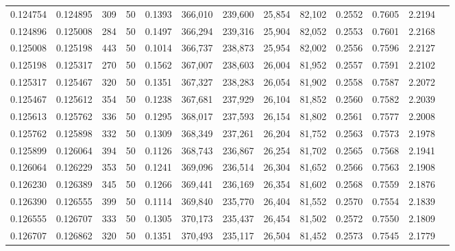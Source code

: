 \begin{tabular}{rrrrrrrrrrrrr}
0.124754 & 0.124895 &   309 &  50 &                                     0.1393 & 366,010 & 239,600 &  25,854 &  82,102 & 0.2552 & 0.7605 & 2.2194 \\
0.124896 & 0.125008 &   284 &  50 &                                     0.1497 & 366,294 & 239,316 &  25,904 &  82,052 & 0.2553 & 0.7601 & 2.2168 \\
0.125008 & 0.125198 &   443 &  50 &                                     0.1014 & 366,737 & 238,873 &  25,954 &  82,002 & 0.2556 & 0.7596 & 2.2127 \\
0.125198 & 0.125317 &   270 &  50 &                                     0.1562 & 367,007 & 238,603 &  26,004 &  81,952 & 0.2557 & 0.7591 & 2.2102 \\
0.125317 & 0.125467 &   320 &  50 &                                     0.1351 & 367,327 & 238,283 &  26,054 &  81,902 & 0.2558 & 0.7587 & 2.2072 \\
0.125467 & 0.125612 &   354 &  50 &                                     0.1238 & 367,681 & 237,929 &  26,104 &  81,852 & 0.2560 & 0.7582 & 2.2039 \\
0.125613 & 0.125762 &   336 &  50 &                                     0.1295 & 368,017 & 237,593 &  26,154 &  81,802 & 0.2561 & 0.7577 & 2.2008 \\
0.125762 & 0.125898 &   332 &  50 &                                     0.1309 & 368,349 & 237,261 &  26,204 &  81,752 & 0.2563 & 0.7573 & 2.1978 \\
0.125899 & 0.126064 &   394 &  50 &                                     0.1126 & 368,743 & 236,867 &  26,254 &  81,702 & 0.2565 & 0.7568 & 2.1941 \\
0.126064 & 0.126229 &   353 &  50 &                                     0.1241 & 369,096 & 236,514 &  26,304 &  81,652 & 0.2566 & 0.7563 & 2.1908 \\
0.126230 & 0.126389 &   345 &  50 &                                     0.1266 & 369,441 & 236,169 &  26,354 &  81,602 & 0.2568 & 0.7559 & 2.1876 \\
0.126390 & 0.126555 &   399 &  50 &                                     0.1114 & 369,840 & 235,770 &  26,404 &  81,552 & 0.2570 & 0.7554 & 2.1839 \\
0.126555 & 0.126707 &   333 &  50 &                                     0.1305 & 370,173 & 235,437 &  26,454 &  81,502 & 0.2572 & 0.7550 & 2.1809 \\
0.126707 & 0.126862 &   320 &  50 &                                     0.1351 & 370,493 & 235,117 &  26,504 &  81,452 & 0.2573 & 0.7545 & 2.1779 \\

\end{tabular}
